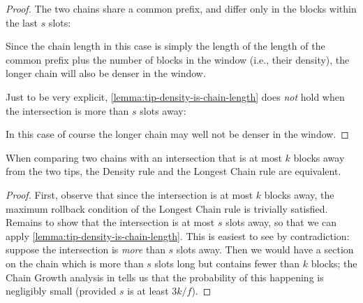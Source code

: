 \begin{proof}
The two chains share a common prefix, and differ only in the blocks
within the last $s$ slots:
%
\begin{center}
\end{center}
%
Since the chain length in this case is simply the length of the length of the
common prefix plus the number of blocks in the window (i.e., their density),
the longer chain will also be denser in the window.

Just to be very explicit, \cref{lemma:tip-density-is-chain-length} does
\emph{not} hold when the intersection is more than $s$ slots away:
%
\begin{center}
\end{center}
%
In this case of course the longer chain may well not be denser in the window.
\end{proof}

\begin{lemma}
\label{lemma:rule-equivalence}
When comparing two chains with an intersection that is at most $k$ blocks away
from the two tips, the Density rule and the Longest Chain rule are equivalent.
\end{lemma}

\begin{proof}
First, observe that since the intersection is at most $k$ blocks away, the
maximum rollback condition of the Longest Chain rule is trivially satisfied.
Remains to show that the intersection is at most $s$ slots away, so that we can
apply \cref{lemma:tip-density-is-chain-length}. This is easiest to see by
contradiction: suppose the intersection is \emph{more} than $s$ slots away. Then
we would have a section on the chain which is more than $s$ slots long but
contains fewer than $k$ blocks; the Chain Growth analysis in
\cite{cryptoeprint:2017:573,cryptoeprint:2018:378} tells us that the probability
of this happening is negligibly small (provided $s$ is at least $3k/f$).
\end{proof}

